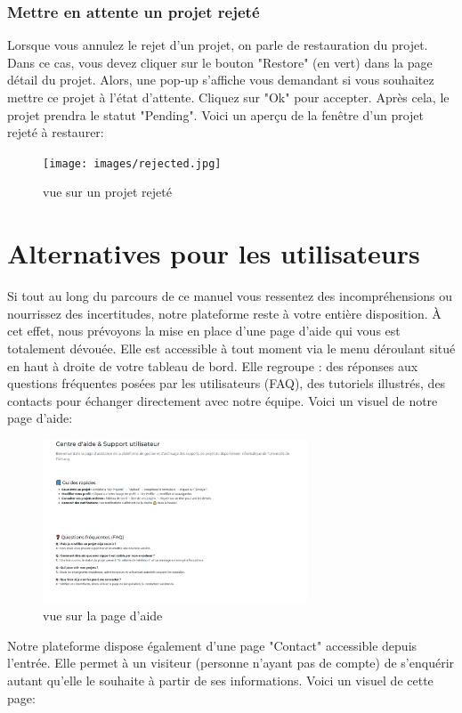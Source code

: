 \documentclass[12pt]{article}
\begin{document}
\newpage
\subsubsection{Mettre en attente un projet rejeté}
Lorsque vous annulez le rejet d'un projet, on parle de restauration du projet. Dans ce cas, vous devez cliquer sur le bouton "Restore" (en vert) dans la page détail du projet. Alors, une pop-up s'affiche vous demandant si vous souhaitez mettre ce projet à l'état d'attente. Cliquez sur "Ok" pour accepter. Après cela, le projet prendra le statut "Pending". Voici un aperçu de la fenêtre d'un projet rejeté à restaurer:        \begin{figure}[h!]
            \centering
            \texttt{[image: images/rejected.jpg]}
            \caption{vue sur un projet rejeté}
            \label{vue sur un projet rejeté}
        \end{figure}
    
\newpage
\section{Alternatives pour les utilisateurs}
Si tout au long du parcours de ce manuel vous ressentez des incompréhensions ou nourrissez des incertitudes, notre plateforme reste à votre entière disposition. À cet effet, nous prévoyons la mise en place d'une page d'aide qui vous est totalement dévouée. Elle est accessible à tout moment via le menu déroulant situé en haut à droite de votre tableau de bord. Elle regroupe : des réponses aux questions fréquentes posées par les utilisateurs (FAQ), des tutoriels illustrés, des contacts pour échanger directement avec notre équipe. Voici un visuel de notre page d'aide:
\medskip
    \begin{figure}[h!]
        \centering
        \includegraphics[width=0.7\textwidth]{images/page-aide.png}
        \caption{vue sur la page d'aide}
        \label{page d'aide}
    \end{figure}     
\medskip
\newline
Notre plateforme dispose également d'une page "Contact" accessible depuis l'entrée. Elle permet à un visiteur (personne n'ayant pas de compte) de s'enquérir autant qu'elle le souhaite à partir de ses informations. Voici un visuel de cette page:
        
\end{document}
